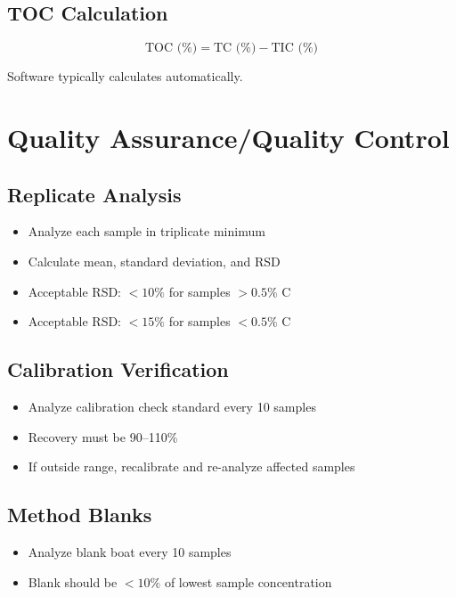 \documentclass[11pt,a4paper]{article}\usepackage[]{graphicx}\usepackage[]{xcolor}
\begin{document}
\subsection{TOC Calculation}
\begin{equation}
\text{TOC (\%)} = \text{TC (\%)} - \text{TIC (\%)}
\end{equation}

Software typically calculates automatically.

\section{Quality Assurance/Quality Control}

\subsection{Replicate Analysis}
\begin{itemize}[noitemsep]
    \item Analyze each sample in triplicate minimum
    \item Calculate mean, standard deviation, and RSD
    \item Acceptable RSD: $<10\%$ for samples $>0.5\%$ C
    \item Acceptable RSD: $<15\%$ for samples $<0.5\%$ C
\end{itemize}

\subsection{Calibration Verification}
\begin{itemize}[noitemsep]
    \item Analyze calibration check standard every 10 samples
    \item Recovery must be 90--110\%
    \item If outside range, recalibrate and re-analyze affected samples
\end{itemize}

\subsection{Method Blanks}
\begin{itemize}[noitemsep]
    \item Analyze blank boat every 10 samples
    \item Blank should be $<10\%$ of lowest sample concentration
\end{itemize}
\end{document}
